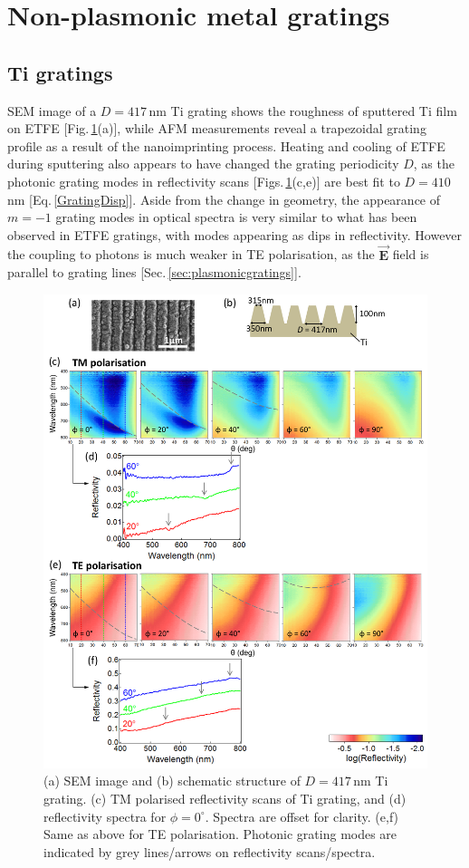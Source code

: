 \section{Non-plasmonic metal gratings}
\subsection{Ti gratings}
SEM image of a $D=417$\,nm Ti grating shows the roughness of sputtered Ti film on ETFE [Fig.\,\ref{7Fig4}(a)], while AFM measurements reveal a trapezoidal grating profile as a result of the nanoimprinting process. Heating and cooling of ETFE during sputtering also appears to have changed the grating periodicity $D$, as the photonic grating modes in reflectivity scans [Figs.\,\ref{7Fig4}(c,e)] are best fit to $D=410$\,nm [Eq.\,\ref{GratingDisp}]. Aside from the change in geometry, the appearance of $m=-1$ grating modes in optical spectra is very similar to what has been observed in ETFE gratings, with modes appearing as dips in reflectivity. However the coupling to photons is much weaker in TE polarisation, as the $\vec{\mathbf{E}}$ field is parallel to grating lines [Sec.\,\ref{sec:plasmonicgratings}].
\begin{figure}[h!] 
\centering    
\includegraphics[width=\textwidth]{Fig4}
\caption[(a) SEM image and (b) schematic structure of $D=417$\,nm Ti grating. Reflectivity measurements of Ti grating in (c,d) TM and (e.f) TE polarisation.]{(a) SEM image and (b) schematic structure of $D=417$\,nm Ti grating. (c) TM polarised reflectivity scans of Ti grating, and (d) reflectivity spectra for $\phi=0^{\circ}$. Spectra are offset for clarity. (e,f) Same as above for TE polarisation. Photonic grating modes are indicated by grey lines/arrows on reflectivity scans/spectra.}
\label{7Fig4}
\end{figure}

